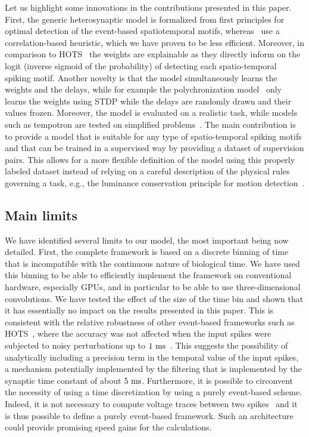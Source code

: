\documentclass[default]{sn-jnl}%
\theoremstyle{thmstyleone}%
\theoremstyle{thmstyletwo}%
\theoremstyle{thmstylethree}%
\begin{document}
Let us highlight some innovations in the contributions presented in this paper. First, the generic heterosynaptic model is formalized from first principles for optimal detection of the event-based spatiotemporal motifs, whereas~\citet{ghosh_spatiotemporal_2019} use a correlation-based heuristic, which we have proven to be less efficient. Moreover, in comparison to HOTS~\citep{lagorce_hots_2017} the weights are explainable as they directly inform on the logit (inverse sigmoid of the probability) of detecting each spatio-temporal spiking motif. Another novelty is that the model simultaneously learns the weights and the delays, while for example the polychronization model~\citep{izhikevich_polychronization_2006} only learns the weights using STDP while the delays are randomly drawn and their values frozen. Moreover, the model is evaluated on a realistic task, while models such as tempotron are tested on simplified problems~\citep{gutig_tempotron_2006}. The main contribution is to provide a model that is suitable for any type of spatio-temporal spiking motifs and that can be trained in a supervised way by providing a dataset of supervision pairs. This allows for a more flexible definition of the model using this properly labeled dataset instead of relying on a careful description of the physical rules governing a task, e.g., the luminance conservation principle for motion detection~\citep{benosman_asynchronous_2012, dardelet_event-by-event_2021}.
%
\subsection{Main limits}
We have identified several limits to our model, the most important being now detailed. First, the complete framework is based on a discrete binning of time that is incompatible with the continuous nature of biological time. We have used this binning to be able to efficiently implement the framework on conventional hardware, especially GPUs, and in particular to be able to use three-dimensional convolutions. We have tested the effect of the size of the time bin and shown that it has essentially no impact on the results presented in this paper. This is consistent with the relative robustness of other event-based frameworks such as HOTS~\citep{lagorce_hots_2017}, where the accuracy was not affected when the input spikes were subjected to noisy perturbations up to $1~\si{\milli\second}$~\citep{grimaldi_robust_2022}. This suggests the possibility of analytically including a precision term in the temporal value of the input spikes, a mechanism potentially implemented by the filtering that is implemented by the synaptic time constant of about $5~\si{\milli\second}$. Furthermore, it is possible to circonvent the necessity of using a time discretization by using a purely event-based scheme. Indeed, it is not necessary to compute voltage traces between two spikes~\citep{hanuschkin_general_2010} and it is thus possible to define a purely event-based framework. Such an architecture could provide promising speed gains for the calculations.
\end{document}
